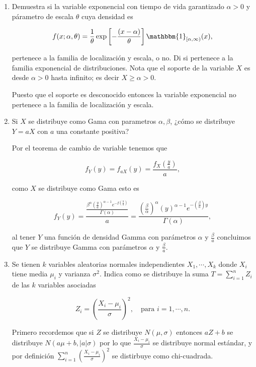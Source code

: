 \documentclass[letterpaper]{article}
\theoremstyle{definition}
\theoremstyle{lemathm}
\theoremstyle{lemathm}
\theoremstyle{lemathm}
\theoremstyle{lemademthm}
\newcommand{\pars}[1]{\left( #1 \right) }
\newcommand{\bracs}[1]{\left[ #1 \right] }
\newcommand{\1}{\mathbbm{1}}
\begin{document}
    \begin{enumerate}
        
		\item Demuestra si la variable exponencial con tiempo de vida garantizado $\alpha>0$ y párametro de escala $\theta$ cuya densidad es
		
		\[f(x;\alpha, \theta) = \frac{1}{\theta} \exp\bracs{-\frac{\pars{x-\alpha}}{\theta}} \1_{[\alpha,\infty)}(x),\]

		pertenece a la familia de localización y escala, o no. Di si pertenece a la familia exponencial de distribuciones. Nota que el soporte de la variable $X$ es desde $\alpha > 0$ hasta infinito; es decir $X\geq\alpha>0$.

		Puesto que el soporte es desconocido entonces la variable exponencial no pertenece a la familia de localización y escala.

		\item Si $X$ se distribuye como Gama con parametros $\alpha, \beta$, ¿cómo se distribuye $Y = aX$ con $a$ una constante positiva?
		
		Por el teorema de cambio de variable tenemos que

		\[f_Y(y) = f_{aX}(y) = \frac{f_X\pars{\frac{y}{a}}}{a},\]

		como $X$ se distribuye como Gama esto es

		\[f_Y(y) = \frac{\frac{\beta^{\alpha}\pars{\frac{y}{a}}^{\alpha-1}e^{-\beta\pars{\frac{y}{a}}}}{\Gamma(\alpha)}}{a} = \frac{\pars{\frac{\beta}{\alpha}}^{\alpha}\pars{y}^{\alpha-1}e^{-\pars{\frac{\beta}{a}}y}}{\Gamma(\alpha)},\]

		al tener $Y$ una función de densidad Gamma con parámetros $\alpha$ y $\frac{\beta}{a}$ concluimos que $Y$ se distribuye Gamma con parámetros $\alpha$ y $\frac{\beta}{a}$.

		\item Se tienen $k$ variables aleatorias normales independientes $X_1,\cdots,X_k$ donde $X_i$ tiene media $\mu_i$ y varianza $\sigma^2$. Indica como se distribuye la suma $T = \sum_{i=1}^n Z_i$ de las $k$ variables asociadas
		
		\[Z_i = \pars{\frac{X_i-\mu_i}{\sigma}}^2, \quad \text{para } i = 1,\cdots, n.\]

		Primero recordemos que si $Z$ se distribuye $N(\mu,\sigma)$ entonces $aZ+b$ se distribuye $N(a\mu + b, |a|\sigma)$ por lo que $\frac{X_i-\mu_i}{\sigma}$ se distribuye normal estándar, y por definición $\sum_{i=1}^n \pars{\frac{X_i-\mu_i}{\sigma}}^2$ se distirbuye como chi-cuadrada.


\end{enumerate}
\end{document}
